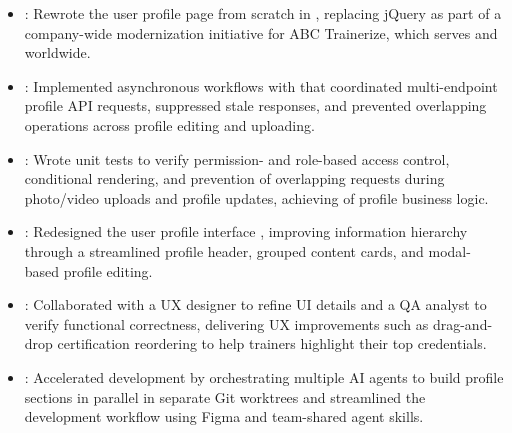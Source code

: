 \begin{itemize}
  \item {}: Rewrote the user profile page from scratch in , replacing jQuery as part of a company-wide modernization initiative for ABC Trainerize, which serves  and  worldwide.
  \item {}: Implemented asynchronous workflows with  that coordinated multi-endpoint profile API requests, suppressed stale responses, and prevented overlapping operations across profile editing and uploading.
  \item {}: Wrote  unit tests to verify permission- and role-based access control, conditional rendering, and prevention of overlapping requests during photo/video uploads and profile updates, achieving  of profile business logic.
  \item {}: Redesigned the user profile interface , improving information hierarchy through a streamlined profile header, grouped content cards, and modal-based profile editing.
  \item {}: Collaborated with a UX designer to refine UI details and a QA analyst to verify functional correctness, delivering UX improvements such as drag-and-drop certification reordering to help trainers highlight their top credentials.
  \item {}: Accelerated development by orchestrating multiple AI agents to build profile sections in parallel in separate Git worktrees and streamlined the development workflow using Figma  and team-shared agent skills.
\end{itemize}
